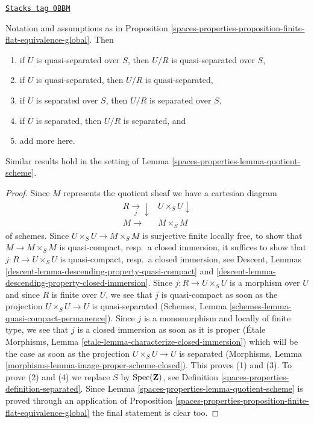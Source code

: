 \begin{lemma}
\label{spaces-properties-lemma-quotient-separated}
\href{https://stacks.math.columbia.edu/tag/0BBM}{\texttt{Stacks tag 0BBM}}

Notation and assumptions as in
Proposition \ref{spaces-properties-proposition-finite-flat-equivalence-global}. Then
\begin{enumerate}
\item if $U$ is quasi-separated over $S$, then $U/R$ is quasi-separated
over $S$,
\item if $U$ is quasi-separated, then $U/R$ is quasi-separated,
\item if $U$ is separated over $S$, then $U/R$ is separated over $S$,
\item if $U$ is separated, then $U/R$ is separated, and
\item add more here.
\end{enumerate}
Similar results hold in the setting of Lemma \ref{spaces-properties-lemma-quotient-scheme}.
\end{lemma}

\begin{proof}
Since $M$ represents the quotient sheaf we have a cartesian diagram
$$
\begin{array}{cc}R \underset{j}{\longrightarrow}\downarrow & U \times_S U \downarrow \\ M \longrightarrow & M \times_S M\end{array}
$$
of schemes. Since $U \times_S U \to M \times_S M$ is surjective finite locally
free, to show that $M \to M \times_S M$ is quasi-compact, resp.\ a closed
immersion, it suffices to show that $j : R \to U \times_S U$ is
quasi-compact, resp.\ a closed immersion, see
Descent, Lemmas \ref{descent-lemma-descending-property-quasi-compact} and
\ref{descent-lemma-descending-property-closed-immersion}.
Since $j : R \to U \times_S U$ is a morphism over $U$ and since
$R$ is finite over $U$, we see that $j$ is quasi-compact as soon
as the projection $U \times_S U \to U$ is quasi-separated
(Schemes, Lemma \ref{schemes-lemma-quasi-compact-permanence}).
Since $j$ is a monomorphism and locally of finite type, we see that
$j$ is a closed immersion as soon as it is proper
(\'Etale Morphisms, Lemma \ref{etale-lemma-characterize-closed-immersion})
which will be the case as soon as the projection
$U \times_S U \to U$ is separated
(Morphisms, Lemma \ref{morphisms-lemma-image-proper-scheme-closed}).
This proves (1) and (3). To prove (2) and (4) we replace $S$ by
$\operatorname{Spec}(\mathbf{Z})$, see Definition \ref{spaces-properties-definition-separated}.
Since Lemma \ref{spaces-properties-lemma-quotient-scheme} is proved through an application of
Proposition \ref{spaces-properties-proposition-finite-flat-equivalence-global}
the final statement is clear too.
\end{proof}

